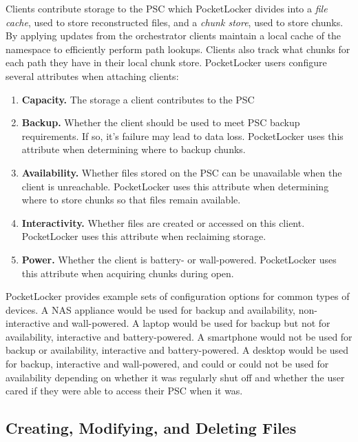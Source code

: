 Clients contribute storage to the PSC which PocketLocker divides into a
\textit{file cache}, used to store reconstructed files, and a \textit{chunk
store}, used to store chunks. By applying updates from the orchestrator
clients maintain a local cache of the namespace to efficiently perform path
lookups. Clients also track what chunks for each path they have in their local
chunk store. PocketLocker users configure several attributes when attaching
clients:

\begin{enumerate}
  
  \item \textbf{Capacity.} The storage a client contributes to the PSC
   
  \item \textbf{Backup.} Whether the client should be used to meet PSC backup
    requirements. If so, it's failure may lead to data loss. PocketLocker
    uses this attribute when determining where to backup chunks.

  \item \textbf{Availability.} Whether files stored on the PSC can be
    unavailable when the client is unreachable. PocketLocker uses this
    attribute when determining where to store chunks so that files remain
    available.

  \item \textbf{Interactivity.} Whether files are created or accessed on this
    client. PocketLocker uses this attribute when reclaiming storage.

  \item \textbf{Power.} Whether the client is battery- or wall-powered.
    PocketLocker uses this attribute when acquiring chunks during open.

\end{enumerate}

PocketLocker provides example sets of configuration options for common types
of devices. A NAS appliance would be used for backup and availability,
non-interactive and wall-powered. A laptop would be used for backup but not
for availability, interactive and battery-powered. A smartphone would not be
used for backup or availability, interactive and battery-powered. A desktop
would be used for backup, interactive and wall-powered, and could or could
not be used for availability depending on whether it was regularly shut off
and whether the user cared if they were able to access their PSC when it was.

\subsection{Creating, Modifying, and Deleting Files}

